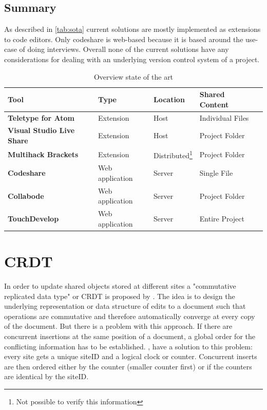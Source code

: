 \subsection{Summary}
As described in \autoref{tab:sota} current solutions are mostly implemented as extensions to code editors. Only codeshare is web-based because it is based around the use-case of doing interviews. Overall none of the current solutions have any considerations for dealing with an underlying version control system of a project.
\begin{table}
	\begin{minipage}{6cm}
		\begin{tabular}{| >{\bfseries}l | l | l | l | l | }
			\hline
				\rowcolor{orange} \bfseries Tool & \bfseries Type & \bfseries Location & \bfseries Shared Content \\
			\hline
			\hline
				Teletype for Atom & Extension & Host & Individual Files \\\hline
				Visual Studio Live Share & Extension & Host & Project Folder \\\hline
				Multihack Brackets & Extension &  Distributed\footnote{Not possible to verify this information} & Project Folder \\\hline
				Codeshare & Web application & Server & Single File \\\hline
				Collabode & Web application & Server & Project Folder \\\hline
				TouchDevelop & Web application & Server & Entire Project \\
			\hline
		\end{tabular}
	\end{minipage}
		\caption{Overview state of the art}
		\label{tab:sota}
	\end{table}

\section{CRDT}
In order to update shared objects stored at different sites a "commutative replicated data type" or CRDT is proposed by \cite{PreguicaMarquesShapiroLetia:2009}. The idea is to design the underlying representation or data structure of edits to a document such that operations are commutative and therefore automatically converge at every copy of the document.
But there is a problem with this approach. If there are concurrent insertions at the same position of a document, a global order for the conflicting information has to be established. \cite{PreguicaMarquesShapiroLetia:2009}, \cite{Oster:2006:DataconsistencyforP2Pcollaborativeediting} have a solution to this problem: every site gets a unique siteID and a logical clock or counter. Concurrent inserts are then ordered either by the counter (smaller counter first) or if the counters are identical by the siteID.

